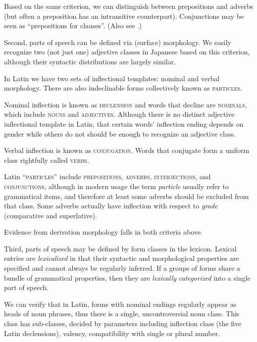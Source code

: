 \documentclass[a4paper, oneside, 12pt]{report}
\newcommand*{\term}[1]{\emph{#1}}
\newcommand*{\category}[1]{\textsc{#1}}
\begin{document}
Based on the same criterion, we can distinguish between prepositions and adverbs
(but often a preposition has an intransitive counterpart).
Conjunctions may be seen as ``prepositions for clauses''.
(Also see .)

Second, parts of speech can be defined via (surface) morphology.
We easily recognize two (not just one) adjective classes in Japanese based on this criterion, although their syntactic distributions are largely similar.

In Latin we have two sets of inflectional templates: nominal and verbal morphology.
There are also indeclinable forms collectively known as \category{particles}.

Nominal inflection is known as \category{declension} and words that decline are \category{nominals}, which include \category{nouns} and \category{adjectives}.
Although there is no distinct adjective inflectional template in Latin,
that certain words' inflection ending depends on gender while others do not should be enough to recognize an adjective class. 

Verbal inflection is known as \category{conjugation}.
Words that conjugate form a uniform class rightfully called \category{verbs}.

Latin ``\category{particles}'' include \category{prepositions}, \category{adverbs},
\category{interjections}, and \category{conjunctions},
although in modern usage the term \term{particle}
usually refer to grammatical items, 
and therefore at least some adverbs should be excluded from that class.
Some adverbs actually have inflection with respect to \emph{grade} 
(comparative and superlative).

Evidence from derivation morphology falls in both criteria above.

Third, parts of speech may be defined by form classes in the lexicon.
Lexical entries are \term{lexicalized} in that their syntactic and morphological properties are specified and cannot always be regularly inferred.
If a groups of forms share a bundle of grammatical properties, then they are \emph{lexically categorized} into a single part of speech.

We can verify that in Latin, forms with nominal endings regularly appear as heads of noun phrases,
thus there is a single, uncontroversial noun class.
This class has sub-classes, decided by parameters including 
inflection class (the five Latin declensions),
valency, 
compatibility with single or plural number. 
\end{document}

